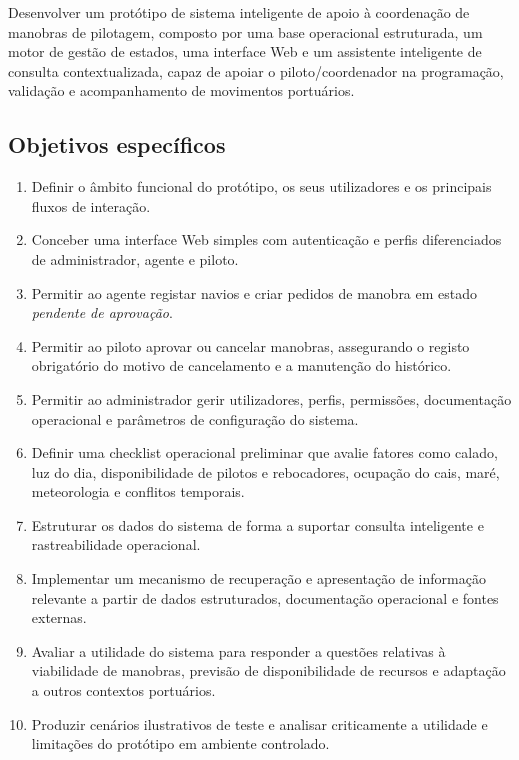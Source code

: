 \documentclass[a4paper,12pt]{report}
\begin{document}
Desenvolver um protótipo de sistema inteligente de apoio à coordenação de manobras de pilotagem, composto por uma base operacional estruturada, um motor de gestão de estados, uma interface Web e um assistente inteligente de consulta contextualizada, capaz de apoiar o piloto/coordenador na programação, validação e acompanhamento de movimentos portuários.

\subsection{Objetivos específicos}

\begin{enumerate}[label=\arabic*.]
    \item Definir o âmbito funcional do protótipo, os seus utilizadores e os principais fluxos de interação.
    \item Conceber uma interface Web simples com autenticação e perfis diferenciados de administrador, agente e piloto.
    \item Permitir ao agente registar navios e criar pedidos de manobra em estado \textit{pendente de aprovação}.
    \item Permitir ao piloto aprovar ou cancelar manobras, assegurando o registo obrigatório do motivo de cancelamento e a manutenção do histórico.
    \item Permitir ao administrador gerir utilizadores, perfis, permissões, documentação operacional e parâmetros de configuração do sistema.
    \item Definir uma checklist operacional preliminar que avalie fatores como calado, luz do dia, disponibilidade de pilotos e rebocadores, ocupação do cais, maré, meteorologia e conflitos temporais.
    \item Estruturar os dados do sistema de forma a suportar consulta inteligente e rastreabilidade operacional.
    \item Implementar um mecanismo de recuperação e apresentação de informação relevante a partir de dados estruturados, documentação operacional e fontes externas.
    \item Avaliar a utilidade do sistema para responder a questões relativas à viabilidade de manobras, previsão de disponibilidade de recursos e adaptação a outros contextos portuários.
    \item Produzir cenários ilustrativos de teste e analisar criticamente a utilidade e limitações do protótipo em ambiente controlado.
\end{enumerate}
\end{document}
